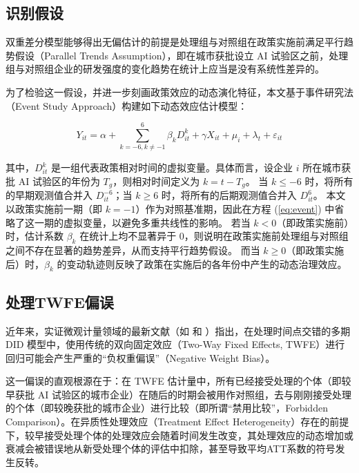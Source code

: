 \documentclass[12pt,hyperref,a4paper,UTF8]{ctexart}
\begin{document}
\subsection{识别假设}

双重差分模型能够得出无偏估计的前提是处理组与对照组在政策实施前满足平行趋势假设（Parallel Trends Assumption），即在城市获批设立 AI 试验区之前，处理组与对照组企业的研发强度的变化趋势在统计上应当是没有系统性差异的。

为了检验这一假设，并进一步刻画政策效应的动态演化特征，本文基于事件研究法（Event Study Approach）构建如下动态效应估计模型：

\begin{equation}
Y_{it} = \alpha + \sum_{k = -6, k \neq -1}^{6} \beta_k D_{it}^k + \gamma X_{it} + \mu_i + \lambda_t + \varepsilon_{it}
\label{eq:event}
\end{equation}

其中，$D_{it}^k$ 是一组代表政策相对时间的虚拟变量。具体而言，设企业 $i$ 所在城市获批 AI 试验区的年份为 $T_g$，则相对时间定义为 $k = t - T_g$。
当 $k \leq -6$ 时，将所有的早期观测值合并入 $D_{it}^{-6}$；当 $k \geq 6$ 时，将所有的后期观测值合并入 $D_{it}^{6}$。
本文以政策实施前一期（即 $k = -1$）作为对照基准期，因此在方程 (\ref{eq:event}) 中省略了这一期的虚拟变量，以避免多重共线性的影响。
若当 $k < 0$（即政策实施前）时，估计系数 $\beta_k$ 在统计上均不显著异于 0，则说明在政策实施前处理组与对照组之间不存在显著的趋势差异，从而支持平行趋势假设。
而当 $k \geq 0$（即政策实施后）时，$\beta_k$ 的变动轨迹则反映了政策在实施后的各年份中产生的动态治理效应。

\subsection{处理TWFE偏误}

近年来，实证微观计量领域的最新文献（如 \textcite{goodman2021difference} 和 \textcite{sun2021estimating}）指出，在处理时间点交错的多期 DID 模型中，使用传统的双向固定效应（Two-Way Fixed Effects, TWFE）进行回归可能会产生严重的“负权重偏误”（Negative Weight Bias）。

这一偏误的直观根源在于：在 TWFE 估计量中，所有已经接受处理的个体（即较早获批 AI 试验区的城市企业）在随后的时期会被用作对照组，去与刚刚接受处理的个体（即较晚获批的城市企业）进行比较（即所谓“禁用比较”，Forbidden Comparison）。在异质性处理效应（Treatment Effect Heterogeneity）存在的前提下，较早接受处理个体的处理效应会随着时间发生改变，其处理效应的动态增加或衰减会被错误地从新受处理个体的评估中扣除，甚至导致平均ATT系数的符号发生反转。
\end{document}
